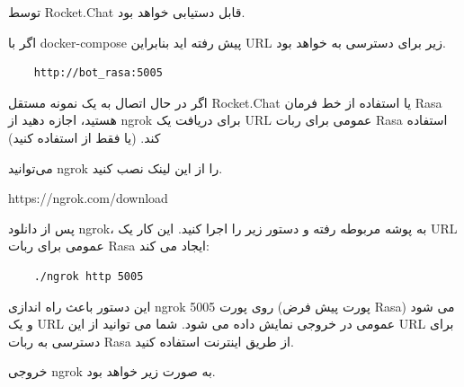  توسط Rocket.Chat قابل دستیابی خواهد بود.

اگر با docker-compose پیش رفته اید بنابراین URL زیر برای دسترسی به  خواهد بود.

\begin{latin}
    \begin{verbatim}
    http://bot_rasa:5005
    \end{verbatim}
\end{latin}

اگر در حال اتصال به یک نمونه مستقل Rocket.Chat یا استفاده از خط فرمان Rasa هستید، اجازه دهید از ngrok برای دریافت یک URL عمومی برای ربات Rasa استفاده کند. (یا فقط از  استفاده کنید)

می‌توانید ngrok را از این لینک نصب کنید.

https://ngrok.com/download

پس از دانلود ngrok، به پوشه مربوطه رفته و دستور زیر را اجرا کنید. این کار یک URL عمومی برای ربات Rasa ایجاد می کند:

\begin{latin}
    \begin{verbatim}
    ./ngrok http 5005
    \end{verbatim}
\end{latin}

این دستور باعث راه اندازی ngrok روی پورت 5005 (پورت پیش فرض Rasa) می شود و یک URL عمومی در خروجی نمایش داده می شود. شما می توانید از این URL برای دسترسی به ربات Rasa از طریق اینترنت استفاده کنید.

خروجی ngrok به صورت زیر خواهد بود.

